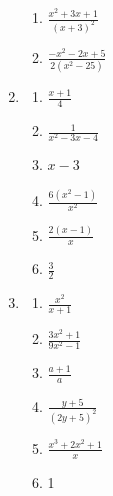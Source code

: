 \begin{description}
\begin{enumerate}[label=\textbf{\thesection.\thetempi.\thetempii}]
\begin{multicols}{3}
\begin{enumerate}[label=\alph*)]
                \item $\frac{x^2+3x+1}{(x+3)^2}$
                
                \item $\frac{-x^2-2x+5}{2(x^2-25)}$
            \end{enumerate}
        \end{multicols}
        
        \item \begin{multicols}{3}
            \begin{enumerate}[label=\alph*)]
                \item $\frac{x+1}{4}$
                
                \item $\frac{1}{x^2-3x-4}$
                
                \item $x-3$
                
                \item $\frac{6(x^2-1)}{x^2}$
                
                \item $\frac{2(x-1)}{x}$
                
                \item $\frac{3}{2}$
            \end{enumerate}
        \end{multicols}
        
        \item \begin{multicols}{3}
            \begin{enumerate}[label=\alph*)]
                \item $\frac{x^2}{x+1}$
                
                \item $\frac{3x^2+1}{9x^2-1}$
                
                \item $\frac{a+1}{a}$
                
                \item $\frac{y+5}{(2y+5)^2}$
                
                \item $\frac{x^3+2x^2+1}{x}$
                
                \item 1
            \end{enumerate}
        \end{multicols}
        
    \end{enumerate}
\end{description}